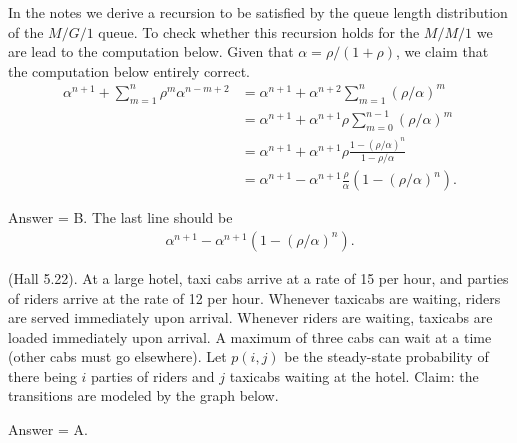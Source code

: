 \begin{exercise}[201807]
In the notes we derive a recursion to be satisfied by the queue length distribution of the $M/G/1$ queue. To check whether this recursion holds for the $M/M/1$ we are lead to the computation below. 
Given that $\alpha = \rho/(1+\rho)$, we claim that the computation below entirely correct. 
\begin{align*}
\alpha^{n+1} + \sum_{m=1}^n \rho^m \alpha^{n-m+2} 
&= \alpha^{n+1} + \alpha^{n+2}\sum_{m=1}^n (\rho/\alpha)^m \\
&= \alpha^{n+1} + \alpha^{n+1}\rho \sum_{m=0}^{n-1} (\rho/\alpha)^m \\
&= \alpha^{n+1} + \alpha^{n+1}\rho \frac{1-(\rho/\alpha)^n}{1-\rho/\alpha}\\
&= \alpha^{n+1} - \alpha^{n+1}\frac{\rho}{\alpha}(1-(\rho/\alpha)^n).
\end{align*}
\begin{solution}
Answer = B. The last line should be
\begin{align*}
\alpha^{n+1} - \alpha^{n+1}(1-(\rho/\alpha)^n).
\end{align*}
\end{solution}
\end{exercise}

\begin{exercise}[201807]
 (Hall 5.22). At a large hotel, taxi cabs arrive at a rate of 15 per
 hour, and parties of riders arrive at the rate of 12 per
 hour. Whenever taxicabs are waiting, riders are served immediately
 upon arrival. Whenever riders are waiting, taxicabs are loaded
 immediately upon arrival. A maximum of three cabs can wait at a time (other cabs must go elsewhere). Let $p(i,j)$ be the steady-state probability of there being $i$ parties of riders and $j$ taxicabs waiting at the hotel. Claim: the transitions are modeled by the graph below.

 \begin{center}

 \end{center}
\begin{solution}
Answer = A.
\end{solution}
\end{exercise}

